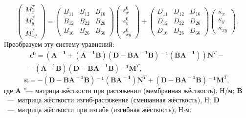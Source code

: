 \[
    \begin{pmatrix}
    M_{x}^T\\
    M_{y}^T\\
    M_{xy}^T
    \end{pmatrix}
    =
    \begin{pmatrix}
    B_{11} & B_{12} & B_{16}\\
    B_{12} & B_{22} & B_{26}\\
    B_{16} & B_{26} & B_{66}
    \end{pmatrix}
    \begin{pmatrix}
    \epsilon_{x}^0\\
    \epsilon_{y}^0\\
    \epsilon_{xy}^0
    \end{pmatrix}
    +
    \begin{pmatrix}
    D_{11} & D_{12} & D_{16}\\
    D_{12} & D_{22} & D_{26}\\
    D_{16} & D_{26} & D_{66}
    \end{pmatrix}
    \begin{pmatrix}
    \kappa_{x}\\
    \kappa_{y}\\
    \kappa_{xy}
    \end{pmatrix}\!\!.
\]
Преобразуем эту систему уравнений:
\begin{multline}\label{eq:eps0_simpmatrix}
\boldsymbol{\epsilon^0} =
\left(
\mathbf{A^{\!\!-1}} %
+
(\mathbf{A^{\!\!-1}B}) %
(\mathbf{D} - \mathbf{B A^{\!\!-1}B})\mathbf{{}^{\!-1}} %
(\mathbf{B A^{\!\!-1}})
\right)
\mathbf{N}^T
- \\ - %
(\mathbf{A^{\!\!-1}B}) %
(\mathbf{D} - \mathbf{B A^{\!\!-1}B})\mathbf{{}^{\!-1}} %
\mathbf{M}^T,
\end{multline}
\begin{equation}\label{eq:kappa_simpmatrix}
\boldsymbol{\kappa} =
-
(\mathbf{D} - \mathbf{B A^{\!\!-1}B})\mathbf{{}^{\!-1}}
(\mathbf{B A^{\!\!-1}})
\mathbf{N}^T
+
(\mathbf{D} - \mathbf{B A^{\!\!-1}B})\mathbf{{}^{\!-1}}
\mathbf{M}^T,
\end{equation}
где $ \mathbf{A} $ "--- матрица жёсткости при растяжении (мембранная жёсткость), Н/м;
$ \mathbf{B} $~---~матрица жёсткости изгиб\nb-растяжение (смешанная жёсткость), Н;
$ \mathbf{D} $~---~матрица жёсткости при изгибе (изгибная жёсткость), Н$\cdot$м.

